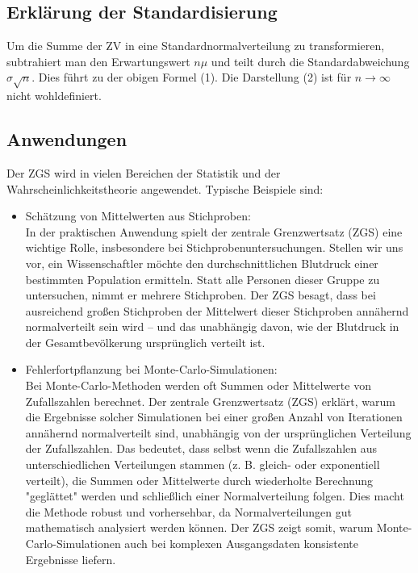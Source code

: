 \documentclass[a4paper,12pt]{article}
\begin{document}
\subsection{Erklärung der Standardisierung}

Um die Summe der ZV in eine Standardnormalverteilung zu transformieren, subtrahiert man den Erwartungswert $n\mu$ und teilt durch die Standardabweichung $\sigma\sqrt{n}$. Dies führt zu der obigen Formel (1). Die Darstellung (2) ist für $n \to \infty$ nicht wohldefiniert.

\subsection{Anwendungen}

Der ZGS wird in vielen Bereichen der Statistik und der Wahrscheinlichkeitstheorie angewendet. Typische Beispiele sind:

\begin{itemize}
    \item Schätzung von Mittelwerten aus Stichproben:\\
    In der praktischen Anwendung spielt der zentrale Grenzwertsatz (ZGS) eine wichtige Rolle, insbesondere bei Stichprobenuntersuchungen. Stellen wir uns vor, ein Wissenschaftler möchte den durchschnittlichen Blutdruck einer bestimmten Population ermitteln. Statt alle Personen dieser Gruppe zu untersuchen, nimmt er mehrere Stichproben. Der ZGS besagt, dass bei ausreichend großen Stichproben der Mittelwert dieser Stichproben annähernd normalverteilt sein wird – und das unabhängig davon, wie der Blutdruck in der Gesamtbevölkerung ursprünglich verteilt ist.
    
    \item Fehlerfortpflanzung bei Monte-Carlo-Simulationen:\\
    Bei Monte-Carlo-Methoden werden oft Summen oder Mittelwerte von Zufallszahlen berechnet. Der zentrale Grenzwertsatz (ZGS) erklärt, warum die Ergebnisse solcher Simulationen bei einer großen Anzahl von Iterationen annähernd normalverteilt sind, unabhängig von der ursprünglichen Verteilung der Zufallszahlen. Das bedeutet, dass selbst wenn die Zufallszahlen aus unterschiedlichen Verteilungen stammen (z. B. gleich- oder exponentiell verteilt), die Summen oder Mittelwerte durch wiederholte Berechnung "geglättet" werden und schließlich einer Normalverteilung folgen. Dies macht die Methode robust und vorhersehbar, da Normalverteilungen gut mathematisch analysiert werden können. Der ZGS zeigt somit, warum Monte-Carlo-Simulationen auch bei komplexen Ausgangsdaten konsistente Ergebnisse liefern.

\end{itemize}
\end{document}
